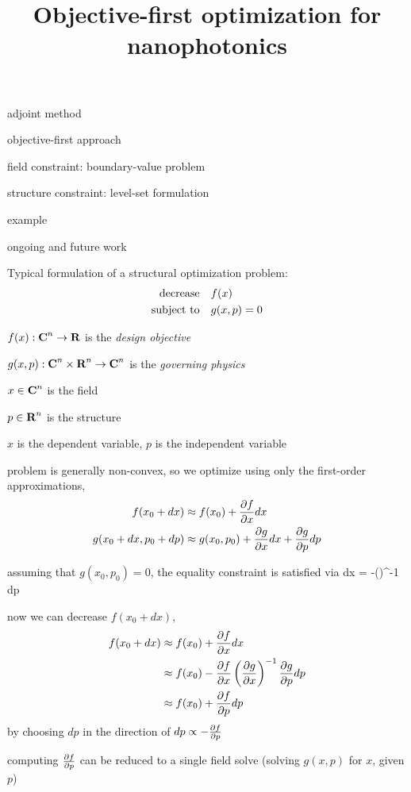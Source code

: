\documentclass[landscape]{foils}
\title{Objective-first optimization for nanophotonics}
\author{}
\date{}
\renewcommand{\oursection}[1]{
\foilhead[-1.0cm]{#1}
}
\begin{document}
\setlength{\parskip}{0cm}
\maketitle

\BIT \itemsep -1pt
\item adjoint method
\item objective-first approach
\item field constraint: boundary-value problem
\item structure constraint: level-set formulation
\item example
\item ongoing and future work
\EIT

\vfill

\oursection{Adjoint method}
Typical formulation of a structural optimization problem:
\begin{align}
\mbox{decrease} & \quad f(x) \\
\mbox{subject to} & \quad g(x,p) = 0
\end{align}
\BIT
\item $f(x): {\mbox{\bf C}}^n \to {\mbox{\bf R}}$ is the \emph{design objective}
\item $g(x,p): {\mbox{\bf C}}^n \times {\mbox{\bf R}}^n \to {\mbox{\bf C}}^n$ is the \emph{governing physics}
\item $x \in {\mbox{\bf C}}^n$ is the field 
\item $p \in {\mbox{\bf R}}^n$ is the structure 
\item $x$ is the dependent variable, $p$ is the independent variable
\EIT
\newpage

\BIT
\item problem is generally non-convex, so we optimize using only the first-order approximations,
\begin{align}
f(x_0+dx) & \approx f(x_0) + \frac{\partial f}{\partial x} dx \\
g(x_0+dx,p_0+dp) & \approx g(x_0,p_0) + \frac{\partial g}{\partial x} dx + \frac{\partial g}{\partial p} dp
\end{align}
\item assuming that $g(x_0,p_0) = 0$, the equality constraint is satisfied via
    \BEQ  dx = -\left(\right)^{-1}  dp \EEQ
\EIT
\newpage

\BIT
\item now we can decrease $f(x_0+dx)$,
    \begin{align} 
    f(x_0+dx) & \approx f(x_0) + \frac{\partial f}{\partial x} dx \\
        & \approx f(x_0) - \frac{\partial f}{\partial x} \left(\frac{\partial g}{\partial x}\right)^{-1} \frac{\partial g}{\partial p} dp \\
        & \approx f(x_0) + \frac{\partial f}{\partial p} dp
    \end{align}
    by choosing $dp$ in the direction of $dp \propto -\frac{\partial f}{\partial p}$
\item computing $\frac{\partial f}{\partial p}$ can be reduced to a single field solve (\ie solving $g(x,p)$ for $x$, given $p$)
\EIT
\newpage
\end{document}
